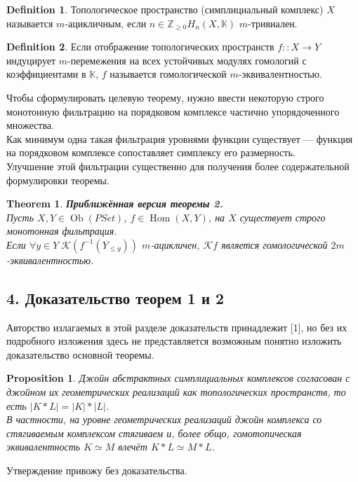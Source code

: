 \documentclass[a4paper, 12pt]{article}
\newtheorem{proposition}{Proposition}
\newtheorem{theorem}{Theorem}
\theoremstyle{definition}
\newtheorem{definition}{Definition}
\theoremstyle{remark}
\begin{document}
\begin{definition}
  Топологическое пространство (симплициальный комплекс) $X$ называется $m$-ацикличным, если $n \in \mathbb{Z}_{\geq 0} H_n(X,\mathbb{K})$ $m$-тривиален.
\end{definition}
\begin{definition}
  Если отображение топологических пространств $f :: X \to Y$ индуцирует $m$-перемежения на всех устойчивых модулях гомологий с коэффициентами в $\mathbb{K}$, $f$ называется гомологической $m$-эквивалентностью.
\end{definition}
Чтобы сформулировать целевую теорему, нужно ввести некоторую строго монотонную фильтрацию на порядковом комплексе частично упорядоченного множества.\\
Как минимум одна такая фильтрация уровнями функции существует --- функция на порядковом комплексе сопоставляет симплексу его размерность.\\
Улучшение этой фильтрации существенно для получения более содержательной формулировки теоремы.
\begin{theorem}
  \textbf{Приближённая версия теоремы 2.}\\
  Пусть $X, Y \in \operatorname{Ob}(PSet)$, $f \in \operatorname{Hom}(X,Y)$, на $X$ существует строго монотонная фильтрация.\\
  Если $\forall y \in Y\;\mathcal{K}(f^{-1}(Y_{\leqslant y}))$ $m$-ацикличен, $\mathcal{K}f$ является гомологической $2m$-эквивалентностью.\\
\end{theorem}

\subsection*{4. Доказательство теорем 1 и 2}

Авторство излагаемых в этой разделе доказательств принадлежит [1], но без их подробного изложения здесь не представляется возможным понятно изложить доказательство основной теоремы.\\

\begin{proposition}
  Джойн абстрактных симплициальных комплексов согласован с джойном их геометрических реализаций как топологических пространств, то есть $|K * L| = |K| * |L|$.\\
  В частности, на уровне геометрических реализаций джойн комплекса со стягиваемым комплексом стягиваем и, более общо, гомотопическая эквивалентность $K \simeq M$ влечёт $K * L \simeq M * L$.
\end{proposition}
Утверждение привожу без доказательства.\\
\end{document}
